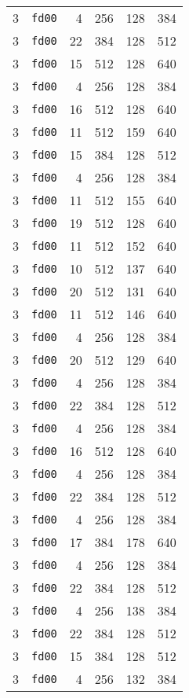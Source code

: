 \documentclass{article}
\begin{document}
\begin{table}[h!]
\begin{tabular}{llrrrl}
    3 & \texttt{fd00} & 4 & 256 & 128 & 384 \\
    3 & \texttt{fd00} & 22 & 384 & 128 & 512 \\
    3 & \texttt{fd00} & 15 & 512 & 128 & 640 \\
    3 & \texttt{fd00} & 4 & 256 & 128 & 384 \\
    3 & \texttt{fd00} & 16 & 512 & 128 & 640 \\
    3 & \texttt{fd00} & 11 & 512 & 159 & 640 \\
    3 & \texttt{fd00} & 15 & 384 & 128 & 512 \\
    3 & \texttt{fd00} & 4 & 256 & 128 & 384 \\
    3 & \texttt{fd00} & 11 & 512 & 155 & 640 \\
    3 & \texttt{fd00} & 19 & 512 & 128 & 640 \\
    3 & \texttt{fd00} & 11 & 512 & 152 & 640 \\
    3 & \texttt{fd00} & 10 & 512 & 137 & 640 \\
    3 & \texttt{fd00} & 20 & 512 & 131 & 640 \\
    3 & \texttt{fd00} & 11 & 512 & 146 & 640 \\
    3 & \texttt{fd00} & 4 & 256 & 128 & 384 \\
    3 & \texttt{fd00} & 20 & 512 & 129 & 640 \\
    3 & \texttt{fd00} & 4 & 256 & 128 & 384 \\
    3 & \texttt{fd00} & 22 & 384 & 128 & 512 \\
    3 & \texttt{fd00} & 4 & 256 & 128 & 384 \\
    3 & \texttt{fd00} & 16 & 512 & 128 & 640 \\
    3 & \texttt{fd00} & 4 & 256 & 128 & 384 \\
    3 & \texttt{fd00} & 22 & 384 & 128 & 512 \\
    3 & \texttt{fd00} & 4 & 256 & 128 & 384 \\
    3 & \texttt{fd00} & 17 & 384 & 178 & 640 \\
    3 & \texttt{fd00} & 4 & 256 & 128 & 384 \\
    3 & \texttt{fd00} & 22 & 384 & 128 & 512 \\
    3 & \texttt{fd00} & 4 & 256 & 138 & 384 \\
    3 & \texttt{fd00} & 22 & 384 & 128 & 512 \\
    3 & \texttt{fd00} & 15 & 384 & 128 & 512 \\
    3 & \texttt{fd00} & 4 & 256 & 132 & 384 \\

\end{tabular}
\end{table}
\end{document}
